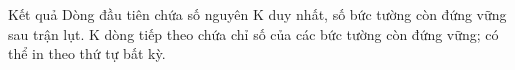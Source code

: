 Kết quả
Dòng đầu tiên chứa số nguyên K duy nhất, số bức tường còn đứng vững sau trận lụt. K dòng tiếp theo chứa chỉ số của các bức tường còn đứng vững; có thể in theo thứ tự bất kỳ.